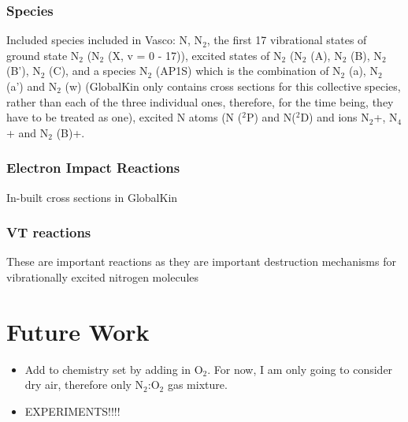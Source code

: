 \documentclass[11pt, oneside]{article}   	%
\begin{document}
\subsubsection{Species}
Included species included in Vasco: N, N$_2$, the first 17 vibrational states of ground state N$_2$ (N$_2$ (X, v = 0 - 17)), excited states of N$_2$ (N$_2$ (A), N$_2$ (B), N$_2$ (B'), N$_2$ (C), and a species N$_2$ (AP1S) which is the combination of N$_2$ (a), N$_2$ (a') and N$_2$ (w) (GlobalKin only contains cross sections for this collective species, rather than each of the three individual ones, therefore, for the time being, they have to be treated as one), excited N atoms (N ($^2$P) and N($^2$D) and ions N$_2$+, N$_4$+ and N$_2$ (B)+.
\subsubsection{Electron Impact Reactions}
In-built cross sections in GlobalKin
\subsubsection{VT reactions}
These are important reactions as they are important destruction mechanisms for vibrationally excited nitrogen molecules

\section{Future Work}
\begin{itemize}
\item Add to chemistry set by adding in O$_2$. For now, I am only going to consider dry air, therefore only N$_2$:O$_2$ gas mixture.
\item EXPERIMENTS!!!!
\end{itemize}






\end{document}
